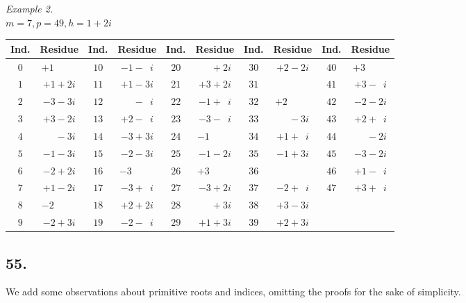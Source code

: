 \documentclass[twoside,12pt]{memoir}
\begin{document}
\begin{center}
\textit{Example 2.}\\
\(m=7, p=49, h=1+2 i\)\\
\begin{tabular}{c|c||c|c||c|c||c|c||c|c}
Ind. & Residue & Ind. & Residue & Ind. & Residue & Ind. & Residue & Ind. & Residue \\
\hline
\(0\) & \(+1\phantom{\;+0i}\) & \(10\) & \(-1-\phantom{1}i\) & \(20\) & \(\phantom{+0}+2 i\) & \(30\) & \(+2-2 i\) & \(40\) & \(+3\phantom{\;+0i} \)\\[-4pt]
\(1\) & \(+1+2 i\) & \(11\) & \(+1-3 i\) & \(21\) & \(+3+2 i\) & \(31\) & \(\) & \(41\) & \(+3-\phantom{1}i \)\\[-4pt]
\(2\) & \(-3-3 i\) & \(12\) & \(\phantom{+0}-\phantom{1}i\) & \(22\) & \(-1+\phantom{1}i\) & \(32\) & \(+2\phantom{\;+0i}\) & \(42\) & \(-2-2 i \)\\[-4pt]
\(3\) & \(+3-2 i\) & \(13\) & \(+2-\phantom{1}i\) & \(23\) & \(-3-\phantom{1}i\) & \(33\) & \(\phantom{+0}-3 i\) & \(43\) & \(+2+\phantom{1}i \)\\[-4pt]
\(4\) & \(\phantom{+0}-3 i\) & \(14\) & \(-3+3 i\) & \(24\) & \(-1\phantom{\;+0i}\) & \(34\) & \(+1+\phantom{1}i\) & \(44\) & \(\phantom{+0}-2 i \)\\[-4pt]
\(5\) & \(-1-3 i\) & \(15\) & \(-2-3 i\) & \(25\) & \(-1-2 i\) & \(35\) & \(-1+3 i\) & \(45\) & \(-3-2 i \)\\[-4pt]
\(6\) & \(-2+2i\) & \(16\) & \(-3\phantom{\;+0i}\) & \(26\) & \(+3\phantom{\;+0i}\) & \(36\) & \(\) & \(46\) & \(+1-\phantom{1}i \)\\[-4pt]
\(7\) & \(+1-2 i\) & \(17\) & \(-3+\phantom{1}i\) & \(27\) & \(-3+2 i\) & \(37\) & \(-2+\phantom{1}i\) & \(47\) & \(+3+\phantom{1}i \)\\[-4pt]
\(8\) & \(-2\phantom{\;+0i}\) & \(18\) & \(+2+2 i\) & \(28\) & \(\phantom{+0}+3 i\) & \(38\) & \(+3-3 i\) & \multicolumn{2}{c}{}\\[-4pt]
\(9\) & \(-2+3 i\) & \(19\) & \(-2-\phantom{1}i\) & \(29\) & \(+1+3 i\) & \(39\) & \(+2+3 i\) & \multicolumn{2}{c}{}
\end{tabular}
\end{center}
%

\subsection*{55.}

We add some observations about primitive roots and indices, omitting the proofs for the sake of simplicity.
\end{document}
